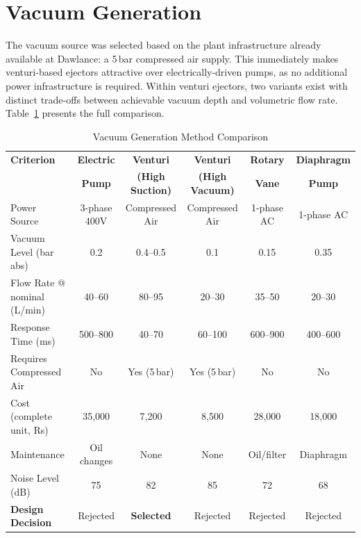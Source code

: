 \section{Vacuum Generation}
\label{sec:vacuum_calc}

The vacuum source was selected based on the plant infrastructure already 
available at Dawlance: a 5\,bar compressed air supply. This immediately 
makes venturi-based ejectors attractive over electrically-driven pumps, 
as no additional power infrastructure is required. Within venturi ejectors, 
two variants exist with distinct trade-offs between achievable vacuum depth 
and volumetric flow rate. Table~\ref{tab:vacuum_generation} presents the 
full comparison.

\begin{table}[htbp]
    \centering
    \scriptsize
    \caption{Vacuum Generation Method Comparison}
    \label{tab:vacuum_generation}
    \begin{tabular}{l c c c c c}
        \toprule
        \textbf{Criterion} & \textbf{Electric} & \textbf{Venturi} 
                           & \textbf{Venturi} & \textbf{Rotary} & \textbf{Diaphragm} \\
                           & \textbf{Pump} & \textbf{(High Suction)} & \textbf{(High Vacuum)} 
                           & \textbf{Vane} & \textbf{Pump} \\
                           \midrule
        Power Source & 3-phase 400V & Compressed Air & Compressed Air 
                     & 1-phase AC & 1-phase AC \\
        Vacuum Level (bar abs) & 0.2 & 0.4--0.5 & 0.1 & 0.15 & 0.35 \\
        Flow Rate @ nominal (L/min) & 40--60 & 80--95 & 20--30 
                                    & 35--50 & 20--30 \\
        Response Time (ms) & 500--800 & 40--70 & 60--100 
                           & 600--900 & 400--600 \\
        Requires Compressed Air & No & Yes (5\,bar) & Yes (5\,bar) 
                                & No & No \\
        Cost (complete unit, Rs) & 35,000 & 7,200 & 8,500 & 28,000 
                                 & 18,000 \\
        Maintenance & Oil changes & None & None & Oil/filter 
                    & Diaphragm \\
        Noise Level (dB) & 75 & 82 & 85 & 72 & 68 \\
        \textbf{Design Decision} & Rejected & \textbf{Selected} 
                                 & Rejected & Rejected & Rejected \\
                                 \bottomrule
    \end{tabular}
\end{table}

